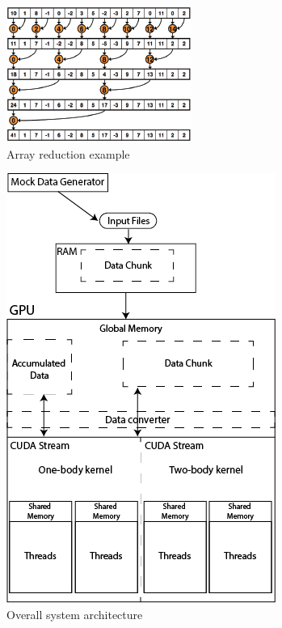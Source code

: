 \documentclass[11pt,a4paper]{report}
\begin{document}
\begin{figure}
 \centerline{ \includegraphics[width=0.65\columnwidth]{images/reduction} }
 \caption{Array reduction example\cite{gpureduction}}
 \label{fg:reduction}
\end{figure}

\begin{figure}
 \centerline{ \includegraphics[width=0.65\columnwidth]{images/overallarchitecture} }
 \caption{Overall system architecture}
 \label{fg:overallarchitecture}
\end{figure}
\end{document}

